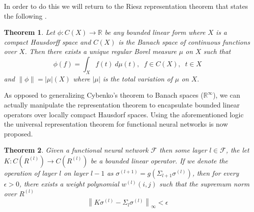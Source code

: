 \documentclass{ib-assignment}
\newtheorem{theorem}{Theorem}
\begin{document}
In order to do this we will return to the Riesz representation theorem that states the following \cite{revisited}. 
\begin{theorem}
Let $\phi:C(X) \to \mathbb{R}$ be any bounded linear form where $X$ is a compact Hausdorff space and $C(X)$ is the Banach space of continuous functions over $X$. Then there exists a unique regular Borel measure $\mu$ on $X$ such that
$$\phi(f) =\int_X f(t)\  d\mu(t),\; \; f\in C(X), \; \; t\in X$$ and $\|\phi\| = |\mu|(X)$ where $|\mu|$ is the total variation of $\mu$ on $X$. 
\end{theorem}
As opposed to generalizing Cybenko's theorem to Banach spaces ($\mathbb{R}^\infty$), we can actually manipulate the representation theorem to encapsulate bounded linear operators over locally compact Hausdorf spaces. Using the aforementioned logic the universal representation theorem for functional neural networks is now proposed.
\begin{theorem}
Given a functional neural network $\mathcal{F}$ then some layer $l \in \mathcal{F}$, the let $K:C(R^{(l)})\to C(R^{(l)})$ be a bounded linear operator. If we denote the operation of layer $l$ on layer $l-1$ as $\sigma^{(l+1)} = g\left(\Sigma_{l+1}\sigma^{(l)}\right)$, then for every $\epsilon >0$, there exists a weight polynomial $w^{(l)}(i,j)$ such that the supremum norm over $R^{(l)}$ $$\left\|K\sigma^{(l)} -\Sigma_l\sigma^{(l)}\right\|_{\infty} < \epsilon$$

\end{theorem}
\end{document}
